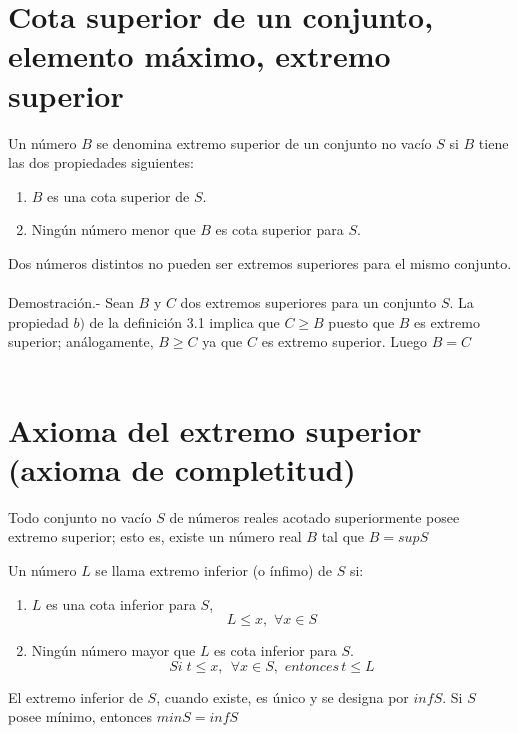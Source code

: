 \setcounter{section}{7}
\section{Cota superior de un conjunto, elemento máximo, extremo superior}
\begin{tcolorbox}[colback=white]
\begin{def.}
Un número $B$ se denomina extremo superior de un conjunto no vacío $S$ si $B$ tiene las dos propiedades siguientes:
\begin{enumerate}[\bfseries a)]
\item $B$ es una cota superior de $S$.
\item Ningún número menor que $B$ es cota superior para $S$.
\end{enumerate}
\end{def.}
\end{tcolorbox}

\begin{teo}
Dos números distintos no pueden ser extremos superiores para el mismo conjunto.\\\\
Demostración.- \; Sean $B$ y $C$ dos extremos superiores para un conjunto $S$. La propiedad $b)$ de la definición 3.1 implica que $C\geq B$ puesto que $B$ es extremo superior; análogamente, $B \geq C$ ya que $C$ es extremo superior. Luego $B = C$ \\\\
\end{teo}

\section{Axioma del extremo superior (axioma de completitud)}

\begin{tcolorbox}[colback=white]
\begin{axioma}
Todo conjunto no vacío $S$ de números reales acotado superiormente posee extremo superior; esto es, existe un número real $B$ tal que $B=sup S$
\end{axioma}
\end{tcolorbox}

\begin{tcolorbox}[colback=white]
\begin{def.}
Un número $L$ se llama extremo inferior (o ínfimo) de $S$ si:
\begin{enumerate}[\bfseries a)]
\item $L$ es una cota inferior para $S$,
$$L\leq x, \, \, \forall x \in S$$
\item Ningún número mayor que $L$ es cota inferior para $S$.
$$Si \; t\leq x, \, \; \forall x \in S, \, \, entonces \, t\leq L $$
\end{enumerate}
El extremo inferior de $S$, cuando existe, es único y se designa por $infS$. Si $S$ posee mínimo, entonces $minS=infS$\\
\end{def.}
\end{tcolorbox}

